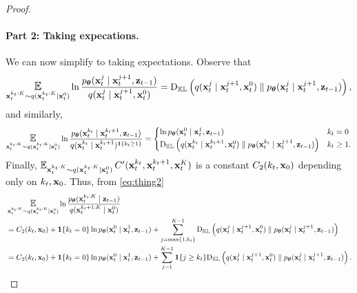 \begin{proof}
\paragraph{Part 2: Taking expecations.} We can now simplify to taking expectations. Observe that 
\begin{align*}
\Exp_{\bx_t^{k_t:K} \sim q(\bx_t^{k_t:K} \mid \bx_t^0)}\ln \frac{\ptheta(\bx_{t}^{j} \mid \bx_{t}^{j+1}, \bz_{t-1})}{q(\bx_{t}^{j} \mid \bx_t^{j+1},\bx_t^0)} = \Dkl\left(q(\bx_{t}^{j} \mid \bx_t^{j+1},\bx_t^0) \parallel \ptheta(\bx_{t}^{j} \mid \bx_{t}^{j+1}, \bz_{t-1})\right),
\end{align*}
and similarly,
\begin{align*}
\Exp_{\bx_t^{k_t:K} \sim q(\bx_t^{k_t:K} \mid \bx_t^0)} \ln \frac{\ptheta(\bx_t^{k_t} \mid \bx_{t}^{k_t+1},  \bz_{t-1})}{q(\bx_t^{k_t} \mid \bx_{t}^{k_t+1})^{\I\{k_t \ge 1\}}}  = \begin{cases} \ln \ptheta(\bx_t^{0} \mid \bx_{t}^{1},  \bz_{t-1}) & k_t = 0 \\
\Dkl\left(q(\bx_{t}^{k_t} \mid \bx_t^{k_t+1},\bx_t^0) \parallel \ptheta(\bx_{t}^{k_t} \mid \bx_{t}^{j+1}, \bz_{t-1})\right) & k_t \ge 1.
\end{cases}
\end{align*}
Finally, $\Exp_{\bx_t^{k_t:K} \sim q(\bx_t^{k_t:K} \mid \bx_t^0)}  C'(\bx_t^{k_t},\bx_t^{k_t+1},\bx_t^K)$ is a constant $C_2(k_t,\mathbf{x}_0)$ depending only on $k_t,\mathbf{x}_0$. 
Thus, from \eqref{eq:thing2}
\begin{align}
&\Exp_{\bx_t^{k_t:K} \sim q(\bx_t^{k_t:K} \mid \bx_t^0)} \ln \frac{ \ptheta(\bx_{t}^{k_t:K} \mid \bz_{t-1})}{q(\bx_t^{k_t+1:K} \mid \bx^{0}_t)}\nonumber\\
&= C_2(k_t,\bx_0) + \I\{k_t = 0\}\ln \ptheta(\bx_t^{0} \mid \bx_{t}^{1},  \bz_{t-1}) +  \sum_{j=\max\{1,k_t\}}^{K-1}\Dkl\left(q(\bx_{t}^{j} \mid \bx_t^{j+1},\bx_t^0) \parallel \ptheta(\bx_{t}^{j} \mid \bx_{t}^{j+1}, \bz_{t-1})\right)\nonumber\\
&= C_2(k_t,\bx_0) + \I\{k_t = 0\}\ln \ptheta(\bx_t^{0} \mid \bx_{t}^{1},  \bz_{t-1}) +  \sum_{j=1}^{K-1}\I\{j \ge k_t\}\Dkl\left(q(\bx_{t}^{j} \mid \bx_t^{j+1},\bx_t^0) \parallel \ptheta(\bx_{t}^{j} \mid \bx_{t}^{j+1}, \bz_{t-1})\right)\nonumber.
\end{align}
\end{proof}


